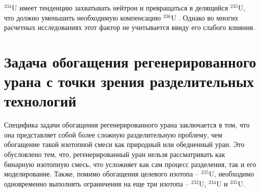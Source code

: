 $^{234}$U имеет тенденцию захватывать нейтрон и превращаться в делящийся $^{235}$U, что должно уменьшить необходимую компенсацию $^{236}$U \cite{dyachenkoIspolzovanieRegenerirovannogoUrana2012}. Однако во многих расчетных исследованиях этот фактор не учитывается ввиду его слабого влияния.



\section{Задача обогащения регенерированного урана с точки зрения разделительных технологий}

Специфика задачи обогащения регенерированного урана заключается в том, что она представляет собой более сложную разделительную проблему, чем обогащение такой изотопной смеси как природный или обедненный уран.
Это обусловлено тем, что, регенерированный уран нельзя рассматривать как бинарную изотопную смесь, что усложняет как сам процесс разделения, так и его моделирование. Также, помимо обогащения целевого изотопа -- $^{235}$U, необходимо одновременно выполнять ограничения на еще три изотопа -- $^{232}$U, $^{234}$U и $^{235}$U.

